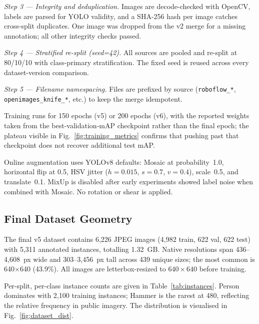 \documentclass{ieeeaccess}
\begin{document}
\textit{Step 3 --- Integrity and deduplication.} Images are decode-checked with OpenCV, labels are parsed for YOLO validity, and a SHA-256 hash per image catches cross-split duplicates. One image was dropped from the v2 merge for a missing annotation; all other integrity checks passed.

\textit{Step 4 --- Stratified re-split (seed=42).} All sources are pooled and re-split at 80/10/10 with class-primary stratification. The fixed seed is reused across every dataset-version comparison.

\textit{Step 5 --- Filename namespacing.} Files are prefixed by source (\texttt{roboflow\_*}, \texttt{openimages\_knife\_*}, etc.) to keep the merge idempotent.

Training runs for 150 epochs (v5) or 200 epochs (v6), with the reported weights taken from the best-validation-mAP checkpoint rather than the final epoch; the plateau visible in Fig.~\ref{fig:training_metrics} confirms that pushing past that checkpoint does not recover additional test mAP.

Online augmentation uses YOLOv8 defaults: Mosaic at probability~1.0, horizontal flip at 0.5, HSV jitter ($h{=}0.015$, $s{=}0.7$, $v{=}0.4$), scale~0.5, and translate~0.1. MixUp is disabled after early experiments showed label noise when combined with Mosaic. No rotation or shear is applied.

\subsection{Final Dataset Geometry}
\label{sec:dataset_geometry}
The final v5 dataset contains 6{,}226 JPEG images (4{,}982 train, 622 val, 622 test) with 5{,}311 annotated instances, totalling 1.32~GB. Native resolutions span 436--4{,}608~px wide and 303--3{,}456~px tall across 439 unique sizes; the most common is 640$\times$640 (43.9\%). All images are letterbox-resized to $640\times640$ before training.

Per-split, per-class instance counts are given in Table~\ref{tab:instances}. Person dominates with 2{,}100 training instances; Hammer is the rarest at 480, reflecting the relative frequency in public imagery. The distribution is visualised in Fig.~\ref{fig:dataset_dist}.
\end{document}
